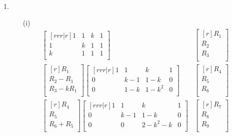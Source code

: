 \documentclass[12pt]{article}
\begin{document}
\begin{enumerate}
\begin{enumerate}
\begin{enumerate}
		\end{enumerate}	
		\medskip
	\item
	\medskip
		\begin{enumerate}
		\item [(i)]
		\begin{align*}
		\begin{bmatrix}[rrr|r]
		1 & 1 & k & 1\\
		1 & k & 1 & 1\\
		k & 1 & 1 & 1\\
		\end{bmatrix}&
		\begin{bmatrix}[r]
		R_1\\ R_2\\ R_3\\
		\end{bmatrix}\\
		\begin{bmatrix}[r]
		R_1\\
		R_2 - R_1\\
		R_3 - kR_1\\
		\end{bmatrix}
		\begin{bmatrix}[rrr|r]
		1 & 1 & k & 1\\
		0 & k-1 & 1-k & 0\\
		0 & 1-k & 1-k^2 & 0\\
		\end{bmatrix}&
		\begin{bmatrix}[r]
		R_{4}\\ R_{5}\\ R_{6}\\
		\end{bmatrix}\\
		\begin{bmatrix}[r]
		R_4\\
		R_5\\
		R_6 + R_5\\
		\end{bmatrix}
		\begin{bmatrix}[rrr|r]
		1 & 1 & k & 1\\
		0 & k-1 & 1-k & 0\\
		0 & 0 & 2 - k^2 - k & 0\\
		\end{bmatrix}&
		\begin{bmatrix}[r]
		R_{7}\\ R_{8}\\ R_{9}\\

\end{bmatrix}
\end{align*}
\end{enumerate}
\end{enumerate}
\end{enumerate}
\end{document}
